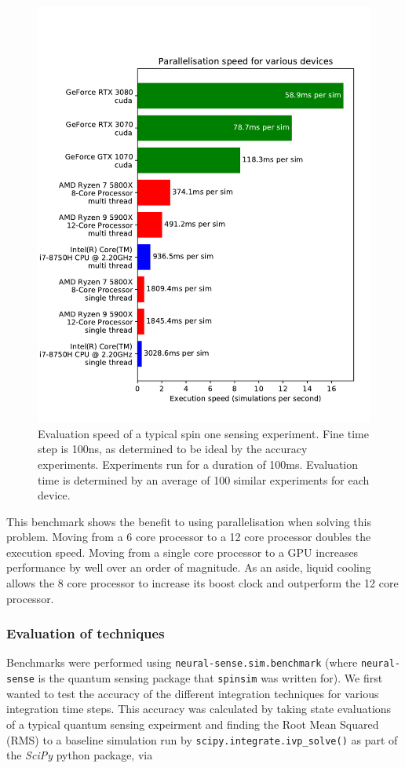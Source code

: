 \documentclass{jors}
\begin{document}
			\begin{figure}[h!]
				\includegraphics[scale=0.9]{benchmark_device_aggregate_publication.pdf}
				\caption{Evaluation speed of a typical spin one sensing experiment. Fine time step is 100ns, as determined to be ideal by the accuracy experiments. Experiments run for a duration of 100ms. Evaluation time is determined by an average of 100 similar experiments for each device.}
				\label{fig:benchmark_device_aggregate}
			\end{figure}

			This benchmark shows the benefit to using parallelisation when solving this problem. Moving from a 6 core processor to a 12 core processor doubles the execution speed. Moving from a single core processor to a GPU increases performance by well over an order of magnitude. As an aside, liquid cooling allows the 8 core processor to increase its boost clock and outperform the 12 core processor.

		\subsubsection*{Evaluation of techniques}
			Benchmarks were performed using \texttt{neural-sense.sim.benchmark} (where \texttt{neural-sense} \cite{alexander-tritt-monash_alexander-tritt-monashneural-sense_2020} is the quantum sensing package that \texttt{spinsim} was written for). We first wanted to test the accuracy of the different integration techniques for various integration time steps. This accuracy was calculated by taking state evaluations of a typical quantum sensing expeirment and finding the Root Mean Squared (RMS) to a baseline simulation run by \texttt{scipy.integrate.ivp\_solve()} as part of the \emph{SciPy} python package, via
\end{document}
